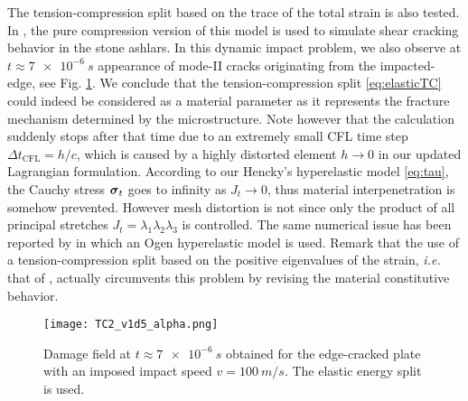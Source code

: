 The tension-compression split based on the trace of the total strain \cite{AmorMarigoMaurini:2009} is also tested. In \cite{LancioniRoyer-Carfagni:2009}, the pure compression version of this model is used to simulate shear cracking behavior in the stone ashlars. In this dynamic impact problem, we also observe at $t\approx\SI{7e-6}{s}$ appearance of mode-\RN{2} cracks originating from the impacted-edge, see Fig. \ref{fig:TC2}. We conclude that the tension-compression split \eqref{eq:elasticTC} could indeed be considered as a material parameter as it represents the fracture mechanism determined by the microstructure. Note however that the calculation suddenly stops after that time due to an extremely small CFL time step $\Delta t_\mathrm{CFL}=h/c$, which is caused by a highly distorted element $h\to 0$ in our updated Lagrangian formulation. According to our Hencky's hyperelastic model \eqref{eq:tau}, the Cauchy stress $\sig_t$ goes to infinity as $J_t\to 0$, thus material interpenetration is somehow prevented. However mesh distortion is not since only the product of all principal stretches $J_t=\lambda_1\lambda_2\lambda_3$ is controlled. The same numerical issue has been reported by \cite{PieroLancioniMarch:2007} in which an Ogen hyperelastic model is used. Remark that the use of a tension-compression split based on the positive eigenvalues of the strain, \emph{i.e.} that of \cite{MieheHofackerWelschinger:2010,FreddiRoyer-Carfagni:2010}, actually circumvents this problem by revising the material constitutive behavior.
\begin{figure}[htbp]
\centering
\texttt{[image: TC2\_v1d5\_alpha.png]}
\caption{Damage field at $t\approx\SI{7e-6}{s}$ obtained for the edge-cracked plate with an imposed impact speed $v=\SI{100}{m/s}$. The elastic energy split \cite{AmorMarigoMaurini:2009} is used.} \label{fig:TC2}
\end{figure}

